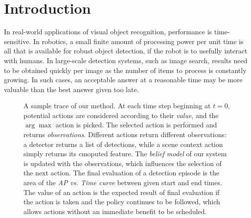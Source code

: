 \section{Introduction} \label{sec:introduction}

In real-world applications of visual object recognition, performance is time-sensitive.%
In robotics, a small finite amount of processing power per unit time is all that is available for robust object detection, if the robot is to usefully interact with humans.
In large-scale detection systems, such as image search, results need to be obtained quickly per image as the number of items to process is constantly growing.
In such cases, an acceptable answer at a reasonable time may be more valuable than the best answer given too late.

\begin{figure}[ht!]
  \caption{
A sample trace of our method.
At each time step beginning at $t=0$, potential actions are considered according to their \emph{value}, and the $\arg\max$ action is picked.
The selected action is performed and returns \emph{observations}.
Different actions return different observations: a detector returns a list of detections, while a scene context action simply returns its cmoputed feature. 
The \emph{belief model} of our system is updated with the observations, which influences the selection of the next action.
The final evaluation of a detection episode is the area of the \emph{AP vs. Time curve} between given start and end times.
The value of an action is the expected result of final evaluation if the action is taken and the policy continues to be followed, which allows actions without an immediate benefit to be scheduled.
}
  \label{fig:figure1}
\end{figure}

